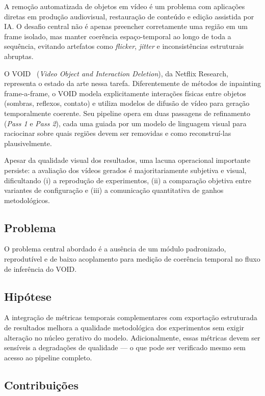 \documentclass[conference]{IEEEtran}
\begin{document}
A remoção automatizada de objetos em vídeo é um problema com aplicações diretas em produção audiovisual, restauração de conteúdo e edição assistida por IA. O desafio central não é apenas preencher corretamente uma região em um frame isolado, mas manter coerência espaço-temporal ao longo de toda a sequência, evitando artefatos como \textit{flicker}, \textit{jitter} e inconsistências estruturais abruptas.

O VOID~\cite{void} (\textit{Video Object and Interaction Deletion}), da Netflix Research, representa o estado da arte nessa tarefa. Diferentemente de métodos de inpainting frame-a-frame, o VOID modela explicitamente interações físicas entre objetos (sombras, reflexos, contato) e utiliza modelos de difusão de vídeo para geração temporalmente coerente. Seu pipeline opera em duas passagens de refinamento (\textit{Pass 1} e \textit{Pass 2}), cada uma guiada por um modelo de linguagem visual para raciocinar sobre quais regiões devem ser removidas e como reconstruí-las plausivelmente.

Apesar da qualidade visual dos resultados, uma lacuna operacional importante persiste: a avaliação dos vídeos gerados é majoritariamente subjetiva e visual, dificultando (i) a reprodução de experimentos, (ii) a comparação objetiva entre variantes de configuração e (iii) a comunicação quantitativa de ganhos metodológicos.

\subsection{Problema}

O problema central abordado é a ausência de um módulo padronizado, reprodutível e de baixo acoplamento para medição de coerência temporal no fluxo de inferência do VOID.

\subsection{Hipótese}

A integração de métricas temporais complementares com exportação estruturada de resultados melhora a qualidade metodológica dos experimentos sem exigir alteração no núcleo gerativo do modelo. Adicionalmente, essas métricas devem ser sensíveis a degradações de qualidade — o que pode ser verificado mesmo sem acesso ao pipeline completo.

\subsection{Contribuições}
\end{document}
